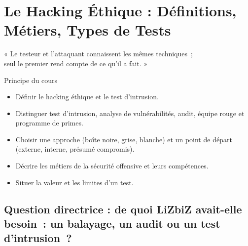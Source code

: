 
\chapter{Le Hacking Éthique : Définitions, Métiers, Types de Tests}
\label{chap:ethique}

\epigraph{%
    « Le testeur et l'attaquant connaissent les mêmes techniques~;\\
    seul le premier rend compte de ce qu'il a fait. »%
}{Principe du cours}


\begin{boxobjectifs}
\begin{itemize}
    \item Définir le hacking éthique et le test d'intrusion.
    \item Distinguer test d'intrusion, analyse de vulnérabilités, audit,
          équipe rouge et programme de primes.
    \item Choisir une approche (boîte noire, grise, blanche) et un point de
          départ (externe, interne, présumé compromis).
    \item Décrire les métiers de la sécurité offensive et leurs
          compétences.
    \item Situer la valeur et les limites d'un test.
\end{itemize}
\end{boxobjectifs}

\bigskip

\section*{Question directrice : de quoi LiZbiZ avait-elle besoin~: un balayage, un audit ou un test d'intrusion~?}

